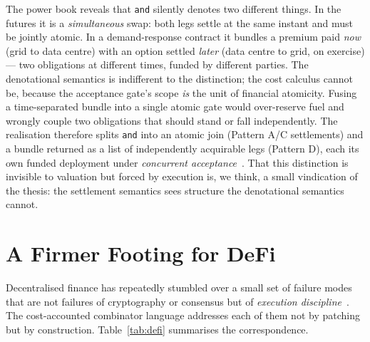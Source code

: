 \documentclass[11pt]{article}
\theoremstyle{definition}
\theoremstyle{plain}
\begin{document}
The power book reveals that \texttt{and} silently denotes two different things. In the futures it is a
\emph{simultaneous} swap: both legs settle at the same instant and must be jointly atomic. In a
demand-response contract it bundles a premium paid \emph{now} (grid to data centre) with an option
settled \emph{later} (data centre to grid, on exercise) --- two obligations at different times, funded
by different parties. The denotational semantics is indifferent to the distinction; the cost calculus
cannot be, because the acceptance gate's scope \emph{is} the unit of financial atomicity. Fusing a
time-separated bundle into a single atomic gate would over-reserve fuel and wrongly couple two
obligations that should stand or fall independently. The realisation therefore splits \texttt{and}
into an atomic join (Pattern A/C settlements) and a bundle returned as a list of independently
acquirable legs (Pattern D), each its own funded deployment under \emph{concurrent
acceptance}~\cite[\S2.3]{CAR2026}. That this distinction is invisible to valuation but forced by
execution is, we think, a small vindication of the thesis: the settlement semantics sees structure
the denotational semantics cannot.

\section{A Firmer Footing for DeFi}\label{sec:defi}

Decentralised finance has repeatedly stumbled over a small set of failure modes that are not failures
of cryptography or consensus but of \emph{execution discipline}~\cite{Atzei2017}. The cost-accounted
combinator language addresses each of them not by patching but by construction.
Table~\ref{tab:defi} summarises the correspondence.
\end{document}
